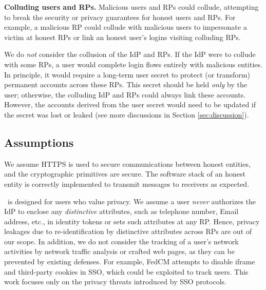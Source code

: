\noindent \textbf{Colluding users and RPs.}
Malicious users and RPs could collude,
 attempting to break the security or privacy guarantees for honest users and RPs.
For example, a malicious RP could collude with malicious users to %
 impersonate a victim at honest RPs or link an honest user's logins visiting colluding RPs.

We do \emph{not} consider the collusion of the IdP and RPs.
If the IdP were to collude with some RPs, a user would complete login flows entirely with malicious entities.
In principle, it would require a long-term user secret to protect (or transform) permanent accounts across these RPs.
This secret should be held \emph{only} by the user; otherwise, the colluding IdP and RPs could always link these accounts.
However, the accounts derived from the user secret would need to be updated if the secret was lost or leaked (see more discussions in Section \ref{sec:discussion}).


\subsection{Assumptions}
We assume HTTPS is used to secure communications between honest entities, and the cryptographic primitives are secure. The software stack of an honest entity is correctly implemented to transmit messages to receivers as expected.

\usso\ is designed for users who value privacy. We assume a user \emph{never} authorizes the IdP to enclose any \emph{distinctive} attributes, such as telephone number, Email address, etc., in identity tokens or sets such attributes at any RP. Hence, privacy leakages due to re-identification by distinctive attributes across RPs are out of our scope.
In addition, we do not consider the tracking of a user's network activities by network traffic analysis or crafted web pages, as they can be prevented by existing defenses. \newc
For example, FedCM \cite{FedCM} attempts to disable iframe and third-party cookies in SSO, which could be exploited to track users. This work focuses only on the privacy threats introduced by SSO protocols.

\oldc


